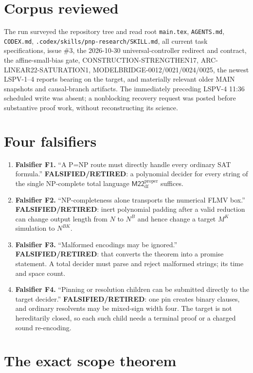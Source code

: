 \documentclass[11pt]{article}
\newcommand{\M}{\mathsf{M22}^{\mathrm{proper}}_{\mathrm{df}}}
\begin{document}
\section{Corpus reviewed}

The run surveyed the repository tree and read root \texttt{main.tex}, \texttt{AGENTS.md},
\texttt{CODEX.md}, \texttt{.codex/skills/pnp-research/SKILL.md}, all current task
specifications, issue \#3, the 2026-10-30 universal-controller redirect and contract,
the affine-small-bias gate, CONSTRUCTION-STRENGTHEN17, ARC-LINEAR22-SATURATION1,
MODELBRIDGE-0012/0021/0024/0025, the newest LSPV-1--4 reports bearing on the target,
and materially relevant older MAIN snapshots and causal-branch artifacts.  The
immediately preceding LSPV-4 11:36 scheduled write was absent; a nonblocking recovery
request was posted before substantive proof work, without reconstructing its science.

\section{Four falsifiers}

\begin{enumerate}
\item \textbf{Falsifier F1.}  ``A P=NP route must directly handle every ordinary SAT
formula.''  \textbf{FALSIFIED/RETIRED}: a polynomial decider for every string of the
single NP-complete total language $\M$ suffices.
\item \textbf{Falsifier F2.}  ``NP-completeness alone transports the numerical FLMV
box.''  \textbf{FALSIFIED/RETIRED}: inert polynomial padding after a valid reduction
can change output length from $N$ to $N^B$ and hence change a target $M^K$ simulation
to $N^{BK}$.
\item \textbf{Falsifier F3.}  ``Malformed encodings may be ignored.''
\textbf{FALSIFIED/RETIRED}: that converts the theorem into a promise statement.
A total decider must parse and reject malformed strings; its time and space count.
\item \textbf{Falsifier F4.}  ``Pinning or resolution children can be submitted directly
to the target decider.''  \textbf{FALSIFIED/RETIRED}: one pin creates binary clauses,
and ordinary resolvents may be mixed-sign width four.  The target is not hereditarily
closed, so each such child needs a terminal proof or a charged sound re-encoding.
\end{enumerate}

\section{The exact scope theorem}
\end{document}
